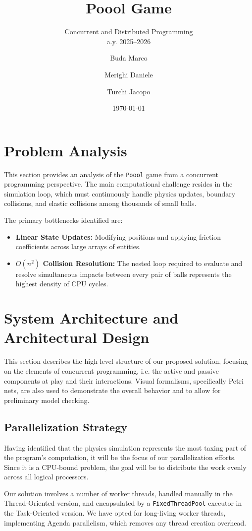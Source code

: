 \documentclass{scrartcl}
\title{\LARGE
  Poool Game
}
\subtitle{Concurrent and Distributed Programming\\a.y. 2025--2026}
\author{
    Buda Marco \and Merighi Daniele \and Turchi Jacopo
}
\date{\today}
\begin{document}
\maketitle

\section{Problem Analysis}

This section provides an analysis of the \texttt{Poool} game from a concurrent programming perspective. The main computational challenge resides in the simulation loop, which must continuously handle physics updates, boundary collisions, and elastic collisions among thousands of small balls.

The primary bottlenecks identified are:
\begin{itemize}
    \item \textbf{Linear State Updates:} Modifying positions and applying friction coefficients across large arrays of entities.
    \item \textbf{$O(n^2)$ Collision Resolution:} The nested loop required to evaluate and resolve simultaneous impacts between every pair of balls represents the highest density of CPU cycles.
\end{itemize}

\section{System Architecture and Architectural Design}
This section describes the high level structure of our proposed solution, focusing on the elements of concurrent programming, i.e. the active and passive components at play and their interactions. Visual formalisms, specifically Petri nets, are also used to demonstrate the overall behavior and to allow for preliminary model checking.

\subsection{Parallelization Strategy}
Having identified that the physics simulation represents the most taxing part of the program's computation, it will be the focus of our parallelization efforts. Since it is a CPU-bound problem, the goal will be to distribute the work evenly across all logical processors.

Our solution involves a number of worker threads, handled manually in the Thread-Oriented version, and encapsulated by a \texttt{FixedThreadPool} executor in the Task-Oriented version. We have opted for long-living worker threads, implementing Agenda parallelism, which removes any thread creation overhead.
\end{document}

